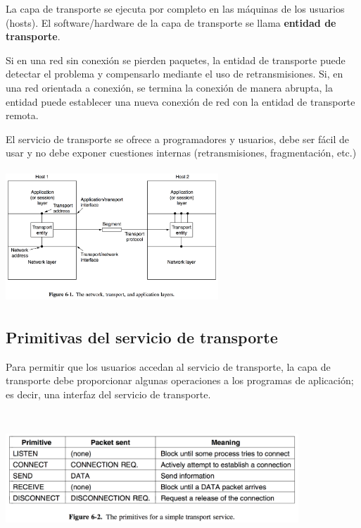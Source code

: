 \documentclass[10pt,a4paper]{report}
\begin{document}
\par La capa de transporte se ejecuta por completo en las máquinas de los usuarios 
(hosts). El software/hardware de la capa de transporte se llama \textbf{entidad de 
transporte}.

\par Si en una red sin conexión se pierden paquetes, la entidad de transporte puede 
detectar el problema y compensarlo mediante el uso de retransmisiones. Si, en una 
red orientada a conexión, se termina la conexión de manera abrupta, la entidad puede 
establecer una nueva conexión de red con la entidad de transporte remota.
\par El servicio de transporte se ofrece a programadores y usuarios, debe ser fácil de 
usar y no debe exponer cuestiones internas (retransmisiones, fragmentación, etc.)

	\begin{center}
	\includegraphics[width=8cm, height=5cm]{./imagenes/transporte.png} 
	\end{center}

\subsection{Primitivas del servicio de transporte}


\par Para permitir que los usuarios accedan al servicio de transporte, la capa de 
transporte debe proporcionar algunas operaciones a los programas de aplicación; es 
decir, una interfaz del servicio de transporte.

\begin{center}
	\includegraphics[width=11cm, height=5cm]{./imagenes/primitivas.png} 
\end{center}
\end{document}
